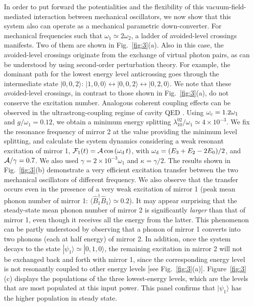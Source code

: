 \documentclass[aps,pra,twocolumn,floatfix,longbibliography, superscriptaddress]{revtex4-1}
\newcommand{\ket}[1]{|#1\rangle}
\newcommand{\figref}[1]{\mbox{Fig.~\ref{#1}}}
\begin{document}
In order to put forward the potentialities and the flexibility of this vacuum-field-mediated interaction between mechanical oscillators, we now show that this system also can  operate as a mechanical parametric down-converter. For mechanical frequencies such that  $\omega_1 \simeq 2 \omega_2$, a ladder of avoided-level crossings manifests. Two of them are shown in Fig.~\ref{fig:3}(a). 
Also in this case, the avoided-level crossings originate from the exchange of virtual photon pairs, as can be understood by using second-order perturbation theory. For example, the dominant path for the lowest energy level anticrossing goes through the intermediate state $|0,0,2 \rangle$: $|1,0,0 \rangle \leftrightarrow |0,0,2 \rangle \leftrightarrow |0,2,0 \rangle$.
We note that these avoided-level crossings, in contrast to those shown in \figref{fig:3}(a), do not conserve the excitation number.
Analogous coherent coupling effects can be observed in the ultrastrong-coupling regime of cavity QED \cite{Stassi2017,Kockum2017,Ma2015,Garziano2015,Garziano2016}.
 Using $\omega_{\rm c} = 1.2 \omega_1$ and $g/\omega_1 = 0.12$, we obtain a minimum energy	 splitting $\lambda^{02}_{10}/\omega_1 \simeq 4 \times 10^{-3}$.
We fix the resonance frequency of mirror 2 at the value providing the minimum level splitting, and calculate the system dynamics considering a weak  resonant excitation of mirror 1,
${\cal F}_1(t) = {\cal A} \cos{(\omega_{\rm d}\, t)}$,
with $\omega_{\rm d} =  (E_3+ E_2 - 2E_0)/2$, and ${\cal A}/ \gamma = 0.7$. We also used $\gamma = 2 \times 10^{-3} \omega_1$ and $\kappa = \gamma/2$. The results shown in Fig.~\ref{fig:3}(b) demonstrate a very efficient excitation transfer between the two mechanical oscillators of different frequency. We also observe that the transfer occurs even in the presence of a very weak excitation of mirror 1 (peak mean phonon number of mirror 1: $\langle \hat B_1^\dag \hat B_1 \rangle \simeq 0.2$).
It may appear  surprising that the steady-state mean phonon number of mirror 2 is significantly {\it larger} than that of mirror 1, even though it receives all the energy from the latter. This phenomenon  can be partly understood by observing that a phonon of mirror 1 converts into two phonons (each at half energy) of mirror 2. In addition, once the system decays to the state $\ket{\psi_1} \simeq \ket{0,1,0}$, the remaining excitation in mirror 2 will not be exchanged back and forth with mirror 1, since the corresponding energy level is not resonantly coupled to other energy levels [see Fig.~\ref{fig:3}(a)]. Figure~\ref{fig:3}(c) displays the populations of the three lowest-energy levels, which are the levels that are most populated at this input power. This panel confirms that $| \psi_1 \rangle$ has the higher population in steady state.
\end{document}
